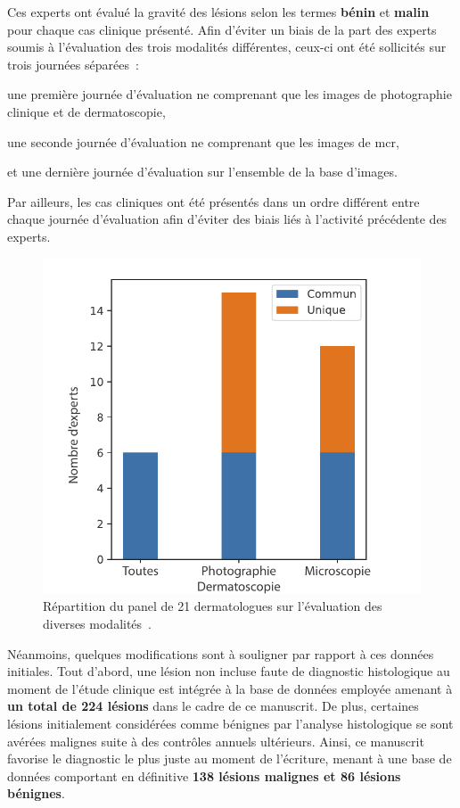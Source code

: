 Ces experts ont évalué la gravité des lésions selon les termes \textbf{bénin} et \textbf{malin} pour chaque cas clinique présenté. Afin d'éviter un biais de la part des experts soumis à l'évaluation des trois modalités différentes, ceux-ci ont été sollicités sur trois journées séparées~:
\begin{inlinerate}
    \item une première journée d'évaluation ne comprenant que les images de photographie clinique et de dermatoscopie,
    \item une seconde journée d'évaluation ne comprenant que les images de \gls{mcr},
    \item et une dernière journée d'évaluation sur l'ensemble de la base d'images.
\end{inlinerate}
Par ailleurs, les cas cliniques ont été présentés dans un ordre différent entre chaque journée d'évaluation afin d'éviter des biais liés à l'activité précédente des experts.\par

\begin{figure}[H]
    \centering
    \includegraphics[width=0.6\linewidth]{contents/chapter_4/resources/experts_evaluation.pdf}
    \caption{Répartition du panel de 21 dermatologues sur l'évaluation des diverses modalités~\cite{Cinotti2018}.}
    \label{fig:experts_evaluation}
\end{figure}\par

Néanmoins, quelques modifications sont à souligner par rapport à ces données initiales. Tout d'abord, une lésion non incluse faute de diagnostic histologique au moment de l'étude clinique est intégrée à la base de données employée amenant à \textbf{un total de 224 lésions} dans le cadre de ce manuscrit. De plus, certaines lésions initialement considérées comme bénignes par l'analyse histologique se sont avérées malignes suite à des contrôles annuels ultérieurs. Ainsi, ce manuscrit favorise le diagnostic le plus juste au moment de l'écriture, menant à une base de données comportant en définitive \textbf{138 lésions malignes et 86 lésions bénignes}.\par
\clearpage

